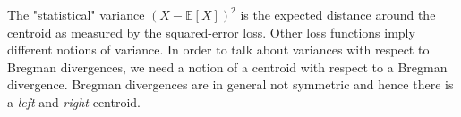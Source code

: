 \documentclass[
    a4paper, %
	fontsize=10pt, %
	twoside=false, %
]{kaobook}
\begin{document}
\begin{titlepage}
The "statistical" variance $(X - \mathbb{E} \left[ X \right])^2$ is the expected distance around the centroid as measured by the squared-error loss. Other loss functions imply different notions of variance.
%
%
%
In order to talk about variances with respect to Bregman divergences, we need a notion of a centroid with respect to a Bregman divergence. Bregman divergences are in general not symmetric and hence there is a \textit{left} and \textit{right} centroid.


\end{titlepage}
\end{document}
